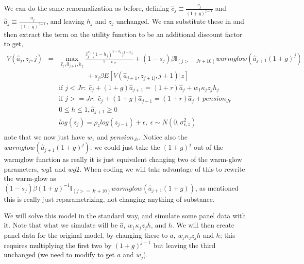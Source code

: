 We can do the same renormalization as before, defining $\hat{c}_j \equiv \frac{c_j}{(1+g)^{j-1}}$ and $\hat{a}_j \equiv \frac{a_j}{(1+g)^{j-1}}$, and leaving $h_j$ and $z_j$ unchanged. We can substitute these in and then extract the term on the utility function to be an additional discount factor to get,
\begin{eqnarray*}
 V(\hat{a}_j,z_j,j)&=& \max_{\hat{c}_j,\hat{a}_{j+1},h_j} \frac{\hat{c}_j^{\sigma_1} (1-h_j)^{1-\sigma_1})^{1-\sigma_2}}{1-\sigma_2} + (1-s_j)\beta  \mathbb{I}_{(j>=Jr+10)} warmglow(\hat{a}_{j+1} (1+g)^j)    \\
 && \quad \quad  \quad \quad  + s_j \beta E[V(\hat{a}_{j+1},z_{j+1]},j+1)|z] \\
&& \text{if }j<Jr: \; \hat{c}_j+(1+g)\hat{a}_{j+1}=(1+r)\hat{a}_j+w_1 \kappa_j z_j h_j\\
&& \text{if }j>=Jr: \; \hat{c}_j+(1+g)\hat{a}_{j+1}=(1+r)\hat{a}_j +pension_{Jr}\\
&& 0\leq h \leq 1, \hat{a}_{j+1} \geq 0 \\
&& log(z_j)=\rho_z log(z_{j-1}) + \epsilon, \; \epsilon \sim N(0,\sigma_{\epsilon,z}^2) \\
\end{eqnarray*}
note that we now just have $w_1$ and $pension_{Jr}$. Notice also the $warmglow(\hat{a}_{j+1} (1+g)^j)$; we could just take the $(1+g)^j$ out of the warmglow function as really it is just equivalent changing two of the warm-glow parameters, $wg1$ and $wg2$. When coding we will take advantage of this to rewrite the warm-glow as $(1-s_j)\beta (1+g)^{-1}  \mathbb{I}_{(j>=Jr+10)} warmglow(\hat{a}_{j+1} (1+g))$, as mentioned this is really just reparametrizing, not changing anything of substance.

We will solve this model in the standard way, and simulate some panel data with it. Note that what we simulate will be $\hat{a}$, $w_1 \kappa_j z_j h$, and $h$. We will then create panel data for the original model, by changing these to $a$, $w_j \kappa_j z_j h$ and $h$; this requires multiplying the first two by $(1+g)^{j-1}$ but leaving the third unchanged (we need to modify to get $a$ and $w_j$).

